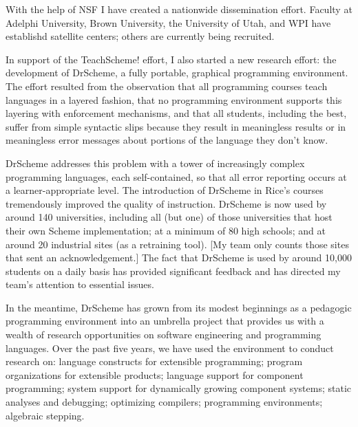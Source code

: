 With the help of NSF I have created a nationwide dissemination effort.
Faculty at Adelphi University, Brown University, the University of
Utah, and WPI have establishd satellite centers; others are currently
being recruited.  

\endtopic


In support of the TeachScheme! effort, I also started a new research
effort: the development of DrScheme, a fully portable, graphical
programming environment. The effort resulted from the observation that all
programming courses teach languages in a layered fashion, that no
programming environment supports this layering with enforcement mechanisms,
and that all students, including the best, suffer from simple syntactic
slips because they result in meaningless results or in meaningless error
messages about portions of the language they don't know. 

DrScheme addresses this problem with a tower of increasingly complex
programming languages, each self-contained, so that all error reporting
occurs at a learner-appropriate level. The introduction of DrScheme in
Rice's courses tremendously improved the quality of instruction.  DrScheme
is now used by around 140 universities, including all (but one) of those
universities that host their own Scheme implementation; at a minimum of 80
high schools; and at around 20 industrial sites (as a retraining tool). [My
team only counts those sites that sent an acknowledgement.] The fact that
DrScheme is used by around 10,000 students on a daily basis has provided
significant feedback and has directed my team's attention to essential
issues.

In the meantime, DrScheme has grown from its modest beginnings as a
pedagogic programming environment into an umbrella project that provides us
with a wealth of research opportunities on software engineering and
programming languages.  Over the past five years, we have used the
environment to conduct research on: 
language constructs for extensible programming; 
program organizations for extensible products; 
language support for component programming; 
system support for dynamically growing component systems; 
static analyses and debugging; 
optimizing compilers; 
programming environments; 
algebraic stepping.

\endtopic
